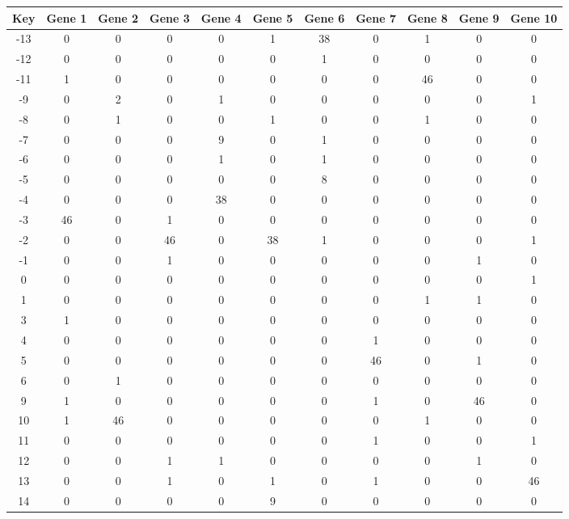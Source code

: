 \begin{tabular}{|c|c|c|c|c|c|c|c|c|c|c|}
\hline
Key & Gene 1 & Gene 2 & Gene 3 & Gene 4 & Gene 5 & Gene 6 & Gene 7 & Gene 8 & Gene 9 & Gene 10 \\
\hline
-13 & 0 & 0 & 0 & 0 & 1 & 38 & 0 & 1 & 0 & 0 \\
-12 & 0 & 0 & 0 & 0 & 0 & 1 & 0 & 0 & 0 & 0 \\
-11 & 1 & 0 & 0 & 0 & 0 & 0 & 0 & 46 & 0 & 0 \\
-9 & 0 & 2 & 0 & 1 & 0 & 0 & 0 & 0 & 0 & 1 \\
-8 & 0 & 1 & 0 & 0 & 1 & 0 & 0 & 1 & 0 & 0 \\
-7 & 0 & 0 & 0 & 9 & 0 & 1 & 0 & 0 & 0 & 0 \\
-6 & 0 & 0 & 0 & 1 & 0 & 1 & 0 & 0 & 0 & 0 \\
-5 & 0 & 0 & 0 & 0 & 0 & 8 & 0 & 0 & 0 & 0 \\
-4 & 0 & 0 & 0 & 38 & 0 & 0 & 0 & 0 & 0 & 0 \\
-3 & 46 & 0 & 1 & 0 & 0 & 0 & 0 & 0 & 0 & 0 \\
-2 & 0 & 0 & 46 & 0 & 38 & 1 & 0 & 0 & 0 & 1 \\
-1 & 0 & 0 & 1 & 0 & 0 & 0 & 0 & 0 & 1 & 0 \\
0 & 0 & 0 & 0 & 0 & 0 & 0 & 0 & 0 & 0 & 1 \\
1 & 0 & 0 & 0 & 0 & 0 & 0 & 0 & 1 & 1 & 0 \\
3 & 1 & 0 & 0 & 0 & 0 & 0 & 0 & 0 & 0 & 0 \\
4 & 0 & 0 & 0 & 0 & 0 & 0 & 1 & 0 & 0 & 0 \\
5 & 0 & 0 & 0 & 0 & 0 & 0 & 46 & 0 & 1 & 0 \\
6 & 0 & 1 & 0 & 0 & 0 & 0 & 0 & 0 & 0 & 0 \\
9 & 1 & 0 & 0 & 0 & 0 & 0 & 1 & 0 & 46 & 0 \\
10 & 1 & 46 & 0 & 0 & 0 & 0 & 0 & 1 & 0 & 0 \\
11 & 0 & 0 & 0 & 0 & 0 & 0 & 1 & 0 & 0 & 1 \\
12 & 0 & 0 & 1 & 1 & 0 & 0 & 0 & 0 & 1 & 0 \\
13 & 0 & 0 & 1 & 0 & 1 & 0 & 1 & 0 & 0 & 46 \\
14 & 0 & 0 & 0 & 0 & 9 & 0 & 0 & 0 & 0 & 0 \\
\hline
\end{tabular}